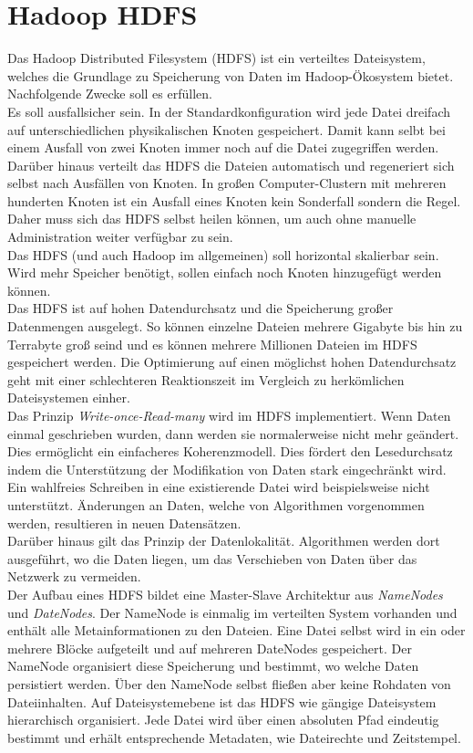\section{Hadoop HDFS}
\label{sec:theory_hdfs}
Das Hadoop Distributed Filesystem (HDFS) ist ein verteiltes Dateisystem, welches die Grundlage zu Speicherung von Daten im Hadoop-Ökosystem bietet. Nachfolgende Zwecke soll es erfüllen.\\
Es soll ausfallsicher sein. In der Standardkonfiguration wird jede Datei dreifach auf unterschiedlichen physikalischen Knoten gespeichert. Damit kann selbt bei einem Ausfall von zwei Knoten immer noch auf die Datei zugegriffen werden. Darüber hinaus verteilt das HDFS die Dateien automatisch und regeneriert sich selbst nach Ausfällen von Knoten. In großen Computer-Clustern mit mehreren hunderten Knoten ist ein Ausfall eines Knoten kein Sonderfall sondern die Regel. Daher muss sich das HDFS selbst heilen können, um auch ohne manuelle Administration weiter verfügbar zu sein.\\
Das HDFS (und auch Hadoop im allgemeinen) soll horizontal skalierbar sein. Wird mehr Speicher benötigt, sollen einfach noch Knoten hinzugefügt werden können.\\
Das HDFS ist auf hohen Datendurchsatz und die Speicherung großer Datenmengen ausgelegt.
So können einzelne Dateien mehrere Gigabyte bis hin zu Terrabyte groß seind und es können mehrere Millionen Dateien im HDFS gespeichert werden. Die Optimierung auf einen möglichst hohen Datendurchsatz geht mit einer schlechteren Reaktionszeit im Vergleich zu herkömlichen Dateisystemen einher.\\
Das Prinzip \textit{Write-once-Read-many} wird im HDFS implementiert. Wenn Daten einmal geschrieben wurden, dann werden sie normalerweise nicht mehr geändert. Dies ermöglicht ein einfacheres Koherenzmodell. Dies fördert den Lesedurchsatz indem die Unterstützung der Modifikation von Daten stark eingechränkt wird. Ein wahlfreies Schreiben in eine existierende Datei wird beispielsweise nicht unterstützt. Änderungen an Daten, welche von Algorithmen vorgenommen werden, resultieren in neuen Datensätzen.\\
Darüber hinaus gilt das Prinzip der Datenlokalität. Algorithmen werden dort ausgeführt, wo die Daten liegen, um das Verschieben von Daten über das Netzwerk zu vermeiden.\cite{hdfs_architecture}\\

\noindent
Der Aufbau eines HDFS bildet eine Master-Slave Architektur aus \textit{NameNodes} und \textit{DateNodes}. Der NameNode is einmalig im verteilten System vorhanden und enthält alle Metainformationen zu den Dateien. Eine Datei selbst wird in ein oder mehrere Blöcke aufgeteilt und auf mehreren DateNodes gespeichert. Der NameNode organisiert diese Speicherung und bestimmt, wo welche Daten persistiert werden. Über den NameNode selbst fließen aber keine Rohdaten von Dateiinhalten. Auf Dateisystemebene ist das HDFS wie gängige Dateisystem hierarchisch organisiert. Jede Datei wird über einen absoluten Pfad eindeutig bestimmt und erhält entsprechende Metadaten, wie Dateirechte und Zeitstempel.  \\

